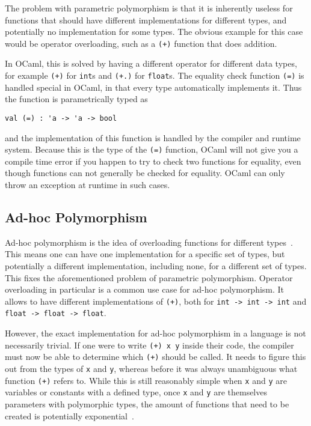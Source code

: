The problem with parametric polymorphism is that it is inherently useless for functions that should have different implementations for different types, and potentially no implementation for some types. The obvious example for this case would be operator overloading, such as a \verb|(+)| function that does addition.

In OCaml, this is solved by having a different operator for different data types, for example \verb|(+)| for \verb|int|s and \verb|(+.)| for \verb|float|s. The equality check function \verb|(=)| is handled special in OCaml, in that every type automatically implements it. Thus the function is parametrically typed as
\begin{verbatim}
val (=) : 'a -> 'a -> bool
\end{verbatim}
and the implementation of this function is handled by the compiler and runtime system. Because this is the type of the \verb|(=)| function, OCaml will not give you a compile time error if you happen to try to check two functions for equality, even though functions can not generally be checked for equality. OCaml can only throw an exception at runtime in such cases.

\subsection{Ad-hoc Polymorphism}\label{ad-hoc-polymorphism}

Ad-hoc polymorphism is the idea of overloading functions for different types~\cite[Chapter~23.2]{pierce-types}. This means one can have one implementation for a specific set of types, but potentially a different implementation, including none, for a different set of types. This fixes the aforementioned problem of parametric polymorphism. Operator overloading in particular is a common use case for ad-hoc polymorphism. It allows to have different implementations of \verb|(+)|, both for \verb|int -> int -> int| and \verb|float -> float -> float|.

However, the exact implementation for ad-hoc polymorphism in a language is not necessarily trivial. If one were to write \verb|(+) x y| inside their code, the compiler must now be able to determine which \verb|(+)| should be called. It needs to figure this out from the types of \verb|x| and \verb|y|, whereas before it was always unambiguous what function \verb|(+)| refers to. While this is still reasonably simple when \verb|x| and \verb|y| are variables or constants with a defined type, once \verb|x| and \verb|y| are themselves parameters with polymorphic types, the amount of functions that need to be created is potentially exponential~\cite{type-classes-original}.

